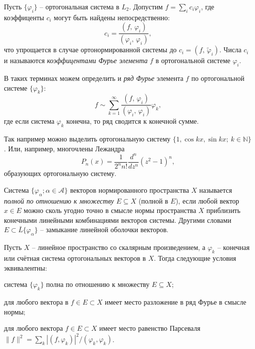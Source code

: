 

Пусть $\{\varphi_i\}$ -- ортогональная система в $L_2$. Допустим $f = \sum_i c_i \varphi_i$, где коэффиценты $c_i$ могут быть найдены непосредственно:
\begin{equation*}
    c_i = \frac{(f,\, \varphi_i)}{\left(\varphi_i,\, \varphi_i\right)},
\end{equation*}
что упрощается в случае ортонормированной системы до $c_i = (f,\, \tilde{\varphi}_i)$. Числа $c_i$ и называются \textit{коэффицентами Фурье элемента} $f$ в ортогональной системе $\varphi_i$. 


В таких терминах можем определить и \textit{ряд Фурье} элемента $f$ по ортогональной системе $\{\varphi_k\}$:
\begin{equation*}
    f \sim \sum_{k=1}^{\infty} \frac{(f,\, \varphi_i)}{\left(\varphi_i,\, \varphi_i\right)} \varphi_k,
\end{equation*}
где если система $\varphi_k$ конечна, то ряд сводится к конечной сумме. 

Так например можно выделить ортогональную систему $\{1, \cos k x, \sin kx; \ k \in \mathbb{N}\}$. Или, например, многочлены Лежандра
\begin{equation*}
    P_n (x) = \frac{1}{2^n n!} \frac{d^n}{d z^n} \left(z^2-1\right)^n,
\end{equation*}
образующих ортогональную систему. 

 
\begin{to_def}
    Система $\{\varphi_\alpha; \alpha \in \mathcal A\}$ векторов нормированного пространства $X$ называется \textit{полной по отношению к множеству} $E \subseteq X$ (полной в $E$), если любой вектор $x \in E$ можно сколь угодно точно в смысле нормы пространства $X$ приблизить конечными линейными комбинациями векторов системы. Другими словами $E \subset \bar{L}\{\varphi_\alpha\}$ -- замыкание линейной оболочки векторов. 
\end{to_def}



\begin{to_thr}
    Пусть $X$ -- линейное пространство со скалярным произведением, а $\varphi_k$ -- конечная или счётная система ортогональных векторов в $X$. Тогда следующие условия эквивалентны: 
    \vspace{-2mm}
    \begin{enumerate*}
        \item система $\{\varphi_k\}$ полна по отношению к множеству $E \subseteq X$;
        \item для любого вектора в $f \in E \subset X$ имеет место разложение в ряд Фурье в смысле нормы;
        \item для любого вектора $f \in E \subset X$ имеет место равенство Парсеваля $\|f\|^2 = \sum_k |(f, \varphi_k)|^2/(\varphi_k, \varphi_k)$.
    \end{enumerate*}
\end{to_thr}


